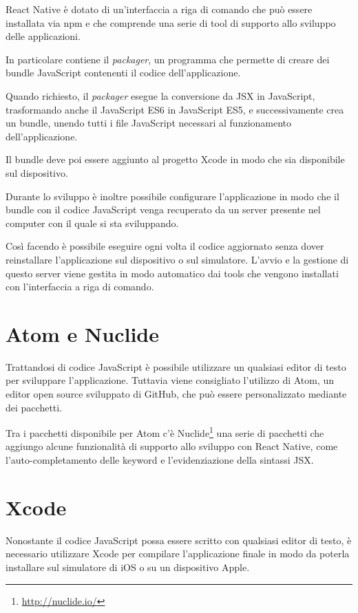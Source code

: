 React Native è dotato di un'interfaccia a riga di comando che può essere installata via npm e che comprende una serie di tool di supporto allo sviluppo delle applicazioni.

In particolare contiene il \textit{packager}, un programma che permette di creare dei bundle JavaScript contenenti il codice dell'applicazione.

Quando richiesto, il \textit{packager} esegue la conversione da JSX in JavaScript, trasformando anche il JavaScript ES6 in JavaScript ES5, e successivamente crea un bundle, unendo tutti i file JavaScript necessari al funzionamento dell'applicazione.

Il bundle deve poi essere aggiunto al progetto Xcode in modo che sia disponibile sul dispositivo.

Durante lo sviluppo è inoltre possibile configurare l'applicazione in modo che il bundle con il codice JavaScript venga recuperato da un server presente nel computer con il quale si sta sviluppando.

Così facendo è possibile eseguire ogni volta il codice aggiornato senza dover reinstallare l'applicazione sul dispositivo o sul simulatore.
L'avvio e la gestione di questo server viene gestita in modo automatico dai tools che vengono installati con l'interfaccia a riga di comando.

\section{Atom e Nuclide}

Trattandosi di codice JavaScript è possibile utilizzare un qualsiasi editor di testo per sviluppare l'applicazione.
Tuttavia viene consigliato l'utilizzo di Atom, un editor open source sviluppato di GitHub, che può essere personalizzato mediante dei pacchetti.

Tra i pacchetti disponibile per Atom c'è Nuclide\footnote{\url{http://nuclide.io/}} una serie di pacchetti che aggiungo alcune funzionalità di supporto allo sviluppo con React Native, come l'auto-completamento delle keyword e l'evidenziazione della sintassi JSX.

\section{Xcode}

Nonostante il codice JavaScript possa essere scritto con qualsiasi editor di testo, è necessario utilizzare Xcode per compilare l'applicazione finale in modo da poterla installare sul simulatore di iOS o su un dispositivo Apple.

